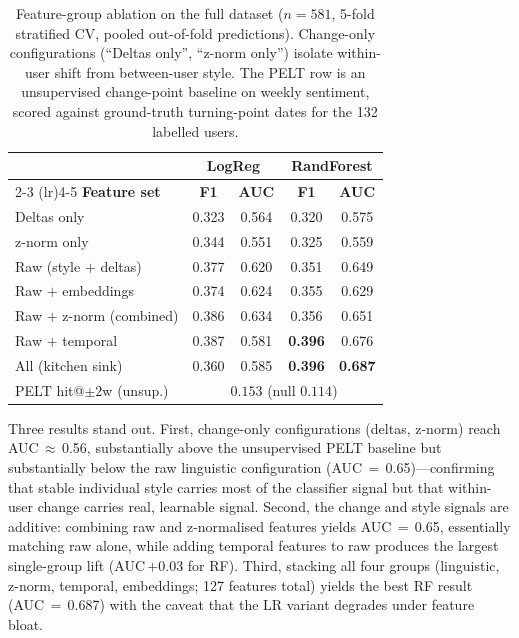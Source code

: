 \documentclass[11pt]{article}
\begin{document}
\begin{table}[t]
\small
\centering
\begin{tabular}{lcccc}
\toprule
& \multicolumn{2}{c}{\textbf{LogReg}} & \multicolumn{2}{c}{\textbf{RandForest}} \\
\cmidrule(lr){2-3} \cmidrule(lr){4-5}
\textbf{Feature set} & \textbf{F1} & \textbf{AUC} & \textbf{F1} & \textbf{AUC} \\
\midrule
Deltas only                 & 0.323 & 0.564 & 0.320 & 0.575 \\
z-norm only                 & 0.344 & 0.551 & 0.325 & 0.559 \\
Raw (style $+$ deltas)      & 0.377 & 0.620 & 0.351 & 0.649 \\
Raw $+$ embeddings          & 0.374 & 0.624 & 0.355 & 0.629 \\
Raw $+$ z-norm (combined)   & 0.386 & 0.634 & 0.356 & 0.651 \\
Raw $+$ temporal            & 0.387 & 0.581 & \textbf{0.396} & 0.676 \\
All (kitchen sink)          & 0.360 & 0.585 & \textbf{0.396} & \textbf{0.687} \\
\midrule
PELT hit@$\pm 2$w (unsup.)  & \multicolumn{4}{c}{$0.153$ (null $0.114$)} \\
\bottomrule
\end{tabular}
\caption{Feature-group ablation on the full dataset
($n{=}581$, 5-fold stratified CV, pooled out-of-fold predictions).
Change-only configurations (``Deltas only'', ``z-norm only'') isolate
within-user shift from between-user style.
The PELT row is an unsupervised change-point baseline on weekly
sentiment, scored against ground-truth turning-point dates for the
132 labelled users.}
\label{tab:ablation}
\end{table}

Three results stand out.
First, change-only configurations (deltas, z-norm) reach
AUC\,$\approx$\,0.56, substantially above the unsupervised PELT
baseline but substantially below the raw linguistic configuration
(AUC\,$=$\,0.65)---confirming that stable individual style carries
most of the classifier signal but that within-user change carries
real, learnable signal.
Second, the change and style signals are additive: combining raw
and z-normalised features yields AUC\,$=$\,0.65, essentially matching
raw alone, while adding temporal features to raw produces the largest
single-group lift (AUC\,$+0.03$ for RF).
Third, stacking all four groups (linguistic, z-norm, temporal,
embeddings; 127 features total) yields the best RF result
(AUC\,$=$\,0.687) with the caveat that the LR variant degrades
under feature bloat.
\end{document}
